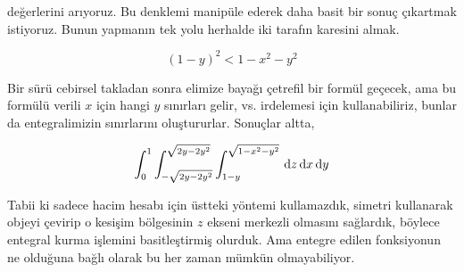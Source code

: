 \documentclass[12pt,fleqn]{article}\usepackage{../../common}
\begin{document}
değerlerini arıyoruz. Bu denklemi manipüle ederek daha basit bir sonuç
çıkartmak istiyoruz. Bunun yapmanın tek yolu herhalde iki tarafın karesini
almak. 

$$ (1-y)^2 < 1-x^2-y^2 $$

Bir sürü cebirsel takladan sonra elimize bayağı çetrefil bir formül
geçecek, ama bu formülü verili $x$ için hangi $y$ sınırları gelir,
vs. irdelemesi için kullanabiliriz, bunlar da entegralimizin sınırlarını
oluştururlar. Sonuçlar altta,

$$ 
\int _{0}^{1} 
\int _{-\sqrt{2y-2y^2}}^{\sqrt{2y-2y^2}} 
\int _{1-y}^{\sqrt{1-x^2-y^2}}
\,\mathrm{d} z \,\mathrm{d} x \,\mathrm{d} y
$$

Tabii ki sadece hacim hesabı için üstteki yöntemi kullamazdık, simetri
kullanarak objeyi çevirip o kesişim bölgesinin $z$ ekseni merkezli olmasını
sağlardık, böylece entegral kurma işlemini basitleştirmiş olurduk. Ama
entegre edilen fonksiyonun ne olduğuna bağlı olarak bu her zaman mümkün
olmayabiliyor. 
\end{document}
